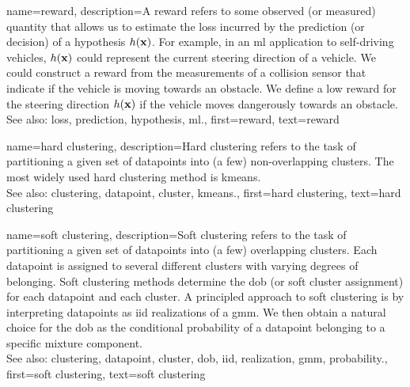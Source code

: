 {name={reward}, 
	description={A reward refers to some observed 
		(or measured) quantity that allows us to estimate the \gls{loss} incurred by the \gls{prediction} 
		(or decision) of a \gls{hypothesis} $h({\bf x})$. For example, in an 
		\gls{ml} application to self-driving vehicles, $h({\bf x})$ could represent 
		the current steering direction of a vehicle. We could construct a reward from the 
		measurements of a collision sensor that indicate if the vehicle is moving towards 
		an obstacle. We define a low reward for the steering direction 
		$h({\bf x})$ if the vehicle moves dangerously towards an obstacle.
			\\
		See also: \gls{loss}, \gls{prediction}, \gls{hypothesis}, \gls{ml}.},
	first={reward}, 
	text={reward}
} 

{name={hard clustering}, 
	description={Hard \gls{clustering} 
		refers to the task of partitioning a given set of \glspl{datapoint} into (a few) non-overlapping \glspl{cluster}. 
		The most widely used hard \gls{clustering} method is \gls{kmeans}.
				\\
		See also: \gls{clustering}, \gls{datapoint}, \gls{cluster}, \gls{kmeans}.},
	first={hard clustering},
	text={hard clustering} 
}
	
{name={soft clustering}, 
	description={Soft \gls{clustering} 
		refers to the task of partitioning a given set of \glspl{datapoint} into (a few) overlapping \glspl{cluster}. 
		Each \gls{datapoint} is assigned to several different \glspl{cluster} with varying degrees of belonging. Soft \gls{clustering} 
		methods determine the \gls{dob} (or soft \gls{cluster} assignment) for each \gls{datapoint} and each \gls{cluster}.
		A principled approach to soft \gls{clustering} is by interpreting \glspl{datapoint} as \gls{iid} \glspl{realization} 
		of a \gls{gmm}. We then obtain a natural choice for the \gls{dob} as the conditional 
		\gls{probability} of a \gls{datapoint} belonging to a specific mixture component.
				\\
		See also: \gls{clustering}, \gls{datapoint}, \gls{cluster}, \gls{dob}, \gls{iid}, \gls{realization}, \gls{gmm}, \gls{probability}.},
	first={soft clustering},
	text={soft clustering} 
}
	
